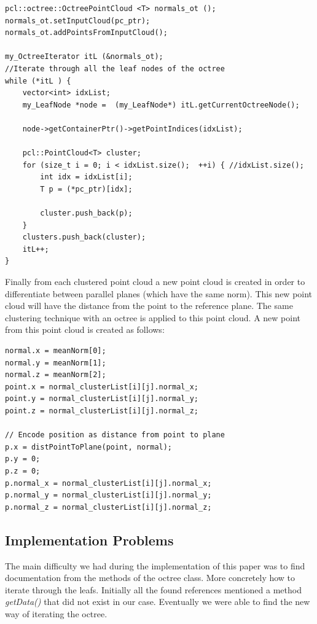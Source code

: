 \documentclass[fontsize=12pt]{article}
\begin{document}
\begin{lstlisting}
pcl::octree::OctreePointCloud <T> normals_ot (); 
normals_ot.setInputCloud(pc_ptr);
normals_ot.addPointsFromInputCloud();

my_OctreeIterator itL (&normals_ot);
//Iterate through all the leaf nodes of the octree
while (*itL ) {
    vector<int> idxList;
    my_LeafNode *node =  (my_LeafNode*) itL.getCurrentOctreeNode();
    
    node->getContainerPtr()->getPointIndices(idxList);

    pcl::PointCloud<T> cluster;
    for (size_t i = 0; i < idxList.size();  ++i) { //idxList.size();
        int idx = idxList[i];
        T p = (*pc_ptr)[idx];
        
        cluster.push_back(p);	
    }
    clusters.push_back(cluster);
    itL++;
}
\end{lstlisting}

Finally from each clustered point cloud a new point cloud is created in order to differentiate between parallel planes (which have the same norm). This new point cloud will have the distance from the point to the reference plane. The same clustering technique with an octree is applied to this point cloud. A new point from this point cloud is created as follows:

\begin{lstlisting}
normal.x = meanNorm[0];
normal.y = meanNorm[1];
normal.z = meanNorm[2];
point.x = normal_clusterList[i][j].normal_x;
point.y = normal_clusterList[i][j].normal_y;
point.z = normal_clusterList[i][j].normal_z;

// Encode position as distance from point to plane
p.x = distPointToPlane(point, normal);
p.y = 0;
p.z = 0;
p.normal_x = normal_clusterList[i][j].normal_x;
p.normal_y = normal_clusterList[i][j].normal_y;
p.normal_z = normal_clusterList[i][j].normal_z;
\end{lstlisting}

\subsection{Implementation Problems}
\label{sub:implementation_problems}

The main difficulty we had during the implementation of this paper was to find documentation from the methods of the octree class. More concretely how to iterate through the leafs. Initially all the found references mentioned a method \textit{getData()} that did not exist in our case. Eventually we were able to find the new way of iterating the octree.\\
\end{document}
